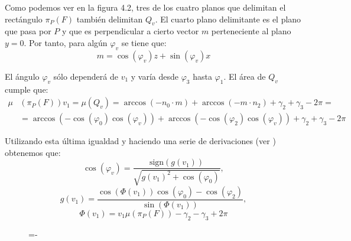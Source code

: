 Como podemos ver en la figura 4.2, tres de los cuatro planos que delimitan el rectángulo $\pi_P(F)$ también delimitan $Q_v$. El cuarto plano delimitante es el plano que pasa por $P$ y que es perpendicular a cierto vector $m$ perteneciente al plano $y=0$. Por tanto, para algún $\varphi_v$ se tiene que:
$$m=\cos(\varphi_v)z+\sin(\varphi_v)x$$

El ángulo $\varphi_v$ sólo dependerá de $v_1$ y varía desde $\varphi_3$ hasta $\varphi_1$. El área de $Q_v$ cumple que:
\begin{align*}
\mu&(\pi_P(F))v_1 = \mu(Q_v) = \arccos(-n_0\cdot m) +\arccos(-m\cdot n_2) + \gamma_2 +\gamma_3 -2\pi =\\
&= \arccos(-\cos(\varphi_0) \cos(\varphi_v)) +\arccos(-\cos(\varphi_2) \cos(\varphi_v)) + \gamma_2 +\gamma_3 -2\pi 
\end{align*}

Utilizando esta última igualdad y haciendo una serie de derivaciones (ver \cite{Urena2013}) obtenemos que:
$$\cos(\varphi_v) = \frac{\text{sign}(g(v_1))}{\sqrt{g(v_1)^2+\cos(\varphi_0)}}, $$
$$g(v_1) = \frac{\cos(\Phi(v_1))\cos(\varphi_0) - \cos(\varphi_2)}{\sin(\Phi(v_1))}, $$
$$\Phi(v_1) = v_1\mu(\pi_P(F))-\gamma_2-\gamma_3+2\pi$$


\begin{figure}[h]
  \lineskip=-\fboxrule
\end{figure}


